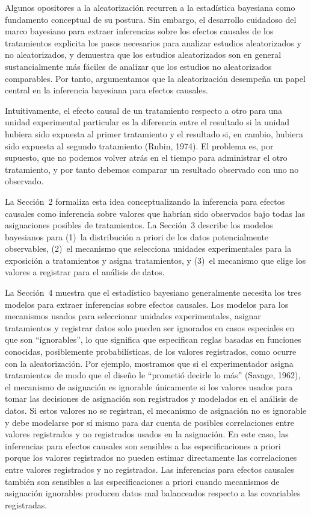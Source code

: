 \documentclass[12pt,a4paper]{article}
\begin{document}
Algunos opositores a la aleatorización recurren a la estadística bayesiana como fundamento
conceptual de su postura. Sin embargo, el desarrollo cuidadoso del marco bayesiano para
extraer inferencias sobre los efectos causales de los tratamientos explicita los pasos
necesarios para analizar estudios aleatorizados y no aleatorizados, y demuestra que los
estudios aleatorizados son en general sustancialmente más fáciles de analizar que los
estudios no aleatorizados comparables. Por tanto, argumentamos que la aleatorización
desempeña un papel central en la inferencia bayesiana para efectos causales.

Intuitivamente, el efecto causal de un tratamiento respecto a otro para una unidad
experimental particular es la diferencia entre el resultado si la unidad hubiera sido
expuesta al primer tratamiento y el resultado si, en cambio, hubiera sido expuesta al
segundo tratamiento (Rubin, 1974). El problema es, por supuesto, que no podemos volver
atrás en el tiempo para administrar el otro tratamiento, y por tanto debemos comparar un
resultado observado con uno no observado.

La Sección~2 formaliza esta idea conceptualizando la inferencia para efectos causales como
inferencia sobre valores que habrían sido observados bajo todas las asignaciones posibles
de tratamientos. La Sección~3 describe los modelos bayesianos para (1)~la distribución a
priori de los datos potencialmente observables, (2)~el mecanismo que selecciona unidades
experimentales para la exposición a tratamientos y asigna tratamientos, y (3)~el mecanismo
que elige los valores a registrar para el análisis de datos.

La Sección~4 muestra que el estadístico bayesiano generalmente necesita los tres modelos
para extraer inferencias sobre efectos causales. Los modelos para los mecanismos usados
para seleccionar unidades experimentales, asignar tratamientos y registrar datos solo
pueden ser ignorados en casos especiales en que son ``ignorables'', lo que significa que
especifican reglas basadas en funciones conocidas, posiblemente probabilísticas, de los
valores registrados, como ocurre con la aleatorización. Por ejemplo, mostramos que si el
experimentador asigna tratamientos de modo que el diseño le ``prometió decirle lo más''
(Savage, 1962), el mecanismo de asignación es ignorable únicamente si los valores usados
para tomar las decisiones de asignación son registrados y modelados en el análisis de
datos. Si estos valores no se registran, el mecanismo de asignación no es ignorable y debe
modelarse por sí mismo para dar cuenta de posibles correlaciones entre valores registrados
y no registrados usados en la asignación. En este caso, las inferencias para efectos
causales son sensibles a las especificaciones a priori porque los valores registrados no
pueden estimar directamente las correlaciones entre valores registrados y no registrados.
Las inferencias para efectos causales también son sensibles a las especificaciones a priori
cuando mecanismos de asignación ignorables producen datos mal balanceados respecto a las
covariables registradas.
\end{document}
